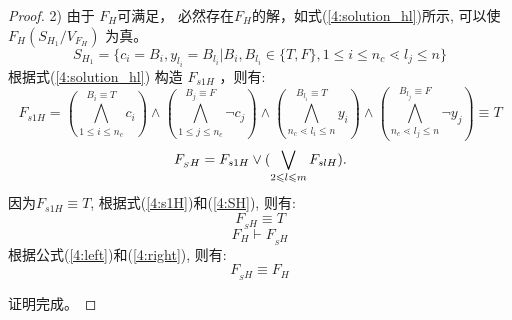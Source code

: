 \begin{proof}
2) 由于 $F_H$可满足，
必然存在$F_H$的解，如式(\ref{4:solution_hl})所示, 可以使$F_H(S_{H_1}/V_{F_H})$ 为真。
\begin{equation}\label{4:solution_hl}
S_{H_1}=\{c_i=B_i, y_{l_i}=B_{l_i}|B_i,B_{l_i} \in \{T,F\}, 1\leqslant i\leqslant n_c \lessdot l_j\leqslant n\}
\end{equation}
根据式(\ref{4:solution_hl}) 构造 $F_{s1H}$ ，则有:
\begin{equation}\label{4:s1H}
F_{s1H}=
(\bigwedge_{1\leqslant i\leqslant n_c}^{B_i\equiv T} c_i)\wedge
(\bigwedge_{1\leqslant j\leqslant n_c}^{B_j\equiv F}\neg c_j)\wedge
(\bigwedge_{n_c\lessdot l_i\leqslant n}^{B_{l_i}\equiv T} y_i)\wedge
(\bigwedge_{n_c\lessdot l_j\leqslant n}^{B_{l_j}\equiv F}\neg y_j)
 \equiv T
\end{equation}
\begin{equation}\label{4:SH}
F_{_SH} =F_ {s1H} \vee (\bigvee_{2\leqslant l\leqslant m}F_{slH}). \\
\end{equation}
因为$F_{s1H} \equiv T$, 根据式(\ref{4:s1H})和(\ref{4:SH}), 则有:
\begin{equation}
F_{_SH} \equiv T
\end{equation}
\begin{equation}\label{4:right}
F_H \vdash F_{_SH}
\end{equation}
根据公式(\ref{4:left})和(\ref{4:right}), 则有:
\begin{equation}
 F_{_SH} \equiv F_H
\end{equation}

证明完成。
\end{proof}

